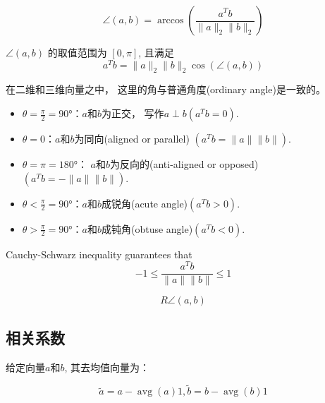 \begin{definition}
    \begin{equation} \angle(a, b)=\arccos \left(\frac{a^{T} b}{\|a\|_{2}\|b\|_{2}}\right) \end{equation}

    $ \angle(a, b) $ 的取值范围为 $ [0, \pi] $, 且满足\begin{equation} a^{T} b=\|a\|_{2}\|b\|_{2} \cos (\angle(a, b)) \end{equation}
\end{definition}

在二维和三维向量之中， 这里的角与普通角度(ordinary angle)是一致的。 

\begin{itemize}
    \item $\theta =\frac{\pi}{2}=90°$：$a$和$b$为正交， 写作$a \perp b (a ^T b  =0)$. 
    \item $\theta =0$：$a$和$b$为同向(aligned or parallel) $(a ^T  b=\| a \| \| b  \| )$. 
    \item $\theta =\pi =180°$： $a$和$b$为反向的(anti-aligned or opposed)$(a ^T   b  = - \| a \| \| b \| )$. 
    \item $\theta <\frac{\pi}{2}=90°$：$a$和$b$成锐角(acute angle)$(a ^T b >0)$. 
    \item $\theta >\frac{\pi}{2}=90°$：$a$和$b$成钝角(obtuse angle)$(a ^T b <0)$. 
\end{itemize}

\begin{theorem}
    Cauchy-Schwarz inequality guarantees that
\begin{equation}
-1 \leq \frac{a^{T} b}{\|a\|\|b\|} \leq 1
\end{equation}
\end{theorem}

\begin{definition}[球面的距离]
    \begin{equation}  {R} \angle(a, b) \end{equation}
\end{definition}

\subsection{相关系数}

给定向量$a$和$b$, 其去均值向量为：

\begin{equation} \tilde{a}=a-\operatorname{avg}(a) 1,  \tilde{b}=b-\operatorname{avg}(b) 1 \end{equation}

